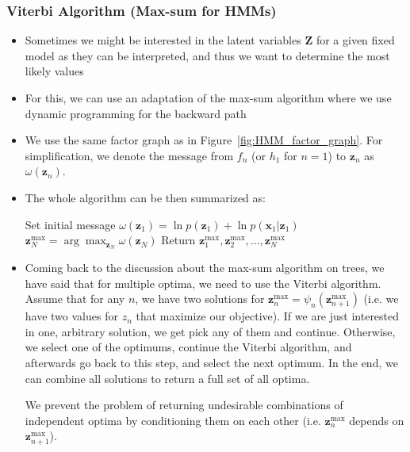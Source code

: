 \subsubsection{Viterbi Algorithm (Max-sum for HMMs)}
\begin{itemize}
	\item Sometimes we might be interested in the latent variables $\bm{Z}$ for a given fixed model as they can be interpreted, and thus we want to determine the most likely values
	\item For this, we can use an adaptation of the max-sum algorithm where we use dynamic programming for the backward path
	\item We use the same factor graph as in Figure~\ref{fig:HMM_factor_graph}. For simplification, we denote the message from $f_n$ (or $h_1$ for $n=1$) to $\bm{z}_n$ as $\omega(\bm{z}_n)$.
	\item The whole algorithm can be then summarized as:
	\begin{tcolorbox}[colback=white!85!gray,colframe=gray!75!black,title=Pseudocode of Viterbi algorithm]
		\begin{algorithm}[H]
			\SetAlgoLined
			\tcp{\textcolor{blue}{Forward pass}}
			Set initial message $\omega(\bm{z}_1) = \ln p(\bm{z}_1) + \ln p(\bm{x}_1|\bm{z}_1)$\;
			\tcp{\textcolor{blue}{Backward pass}}
			$\bm{z}_N^{\text{max}}=\arg\max_{\bm{z}_N} \omega(\bm{z}_N)$\;
			Return $\bm{z}_1^{\text{max}}, \bm{z}_2^{\text{max}},...,\bm{z}_N^{\text{max}}$\;
		\end{algorithm}
	\end{tcolorbox}
	\item Coming back to the discussion about the max-sum algorithm on trees, we have said that for multiple optima, we need to use the Viterbi algorithm. Assume that for any $n$, we have two solutions for $\bm{z}_n^{\text{max}} = \psi_{n}(\bm{z}_{n+1}^{\text{max}})$ (i.e. we have two values for $z_n$ that maximize our objective). If we are just interested in one, arbitrary solution, we get pick any of them and continue. Otherwise, we select one of the optimums, continue the Viterbi algorithm, and afterwards go back to this step, and select the next optimum. In the end, we can combine all solutions to return a full set of all optima. 
	
	We prevent the problem of returning undesirable combinations of independent optima by conditioning them on each other (i.e. $\bm{z}_n^{\text{max}}$ depends on $\bm{z}_{n+1}^{\text{max}}$).
\end{itemize}
